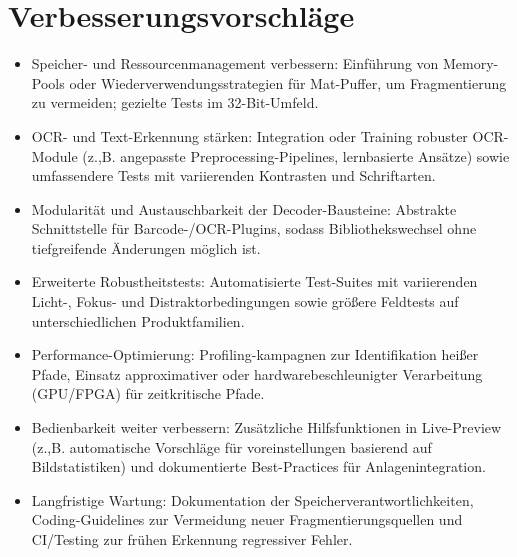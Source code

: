 \documentclass[a4paper,11pt]{article}
\begin{document}
  \section*{Verbesserungsvorschläge}
  \begin{itemize}
  \item Speicher- und Ressourcenmanagement verbessern: Einführung von
    Memory-Pools oder Wiederverwendungsstrategien für Mat-Puffer, um
    Fragmentierung zu vermeiden; gezielte Tests im 32-Bit-Umfeld.
  \item OCR- und Text-Erkennung stärken: Integration oder Training
    robuster OCR-Module (z.,B. angepasste Preprocessing-Pipelines,
    lernbasierte Ansätze) sowie umfassendere Tests mit variierenden
    Kontrasten und Schriftarten.
  \item Modularität und Austauschbarkeit der Decoder-Bausteine:
    Abstrakte Schnittstelle für Barcode-/OCR-Plugins, sodass
    Bibliothekswechsel ohne tiefgreifende Änderungen möglich ist.
  \item Erweiterte Robustheitstests: Automatisierte Test-Suites mit
    variierenden Licht-, Fokus- und Distraktorbedingungen sowie
    größere Feldtests auf unterschiedlichen Produktfamilien.
  \item Performance-Optimierung: Profiling-kampagnen zur
    Identifikation heißer Pfade, Einsatz approximativer oder
    hardwarebeschleunigter Verarbeitung (GPU/FPGA) für zeitkritische
    Pfade.
  \item Bedienbarkeit weiter verbessern: Zusätzliche Hilfsfunktionen
    in Live-Preview (z.,B. automatische Vorschläge für
    voreinstellungen basierend auf Bildstatistiken) und dokumentierte
    Best-Practices für Anlagenintegration.
  \item Langfristige Wartung: Dokumentation der
    Speicherverantwortlichkeiten, Coding-Guidelines zur Vermeidung
    neuer Fragmentierungsquellen und CI/Testing zur frühen Erkennung
    regressiver Fehler.
  \end{itemize}
\end{document}
